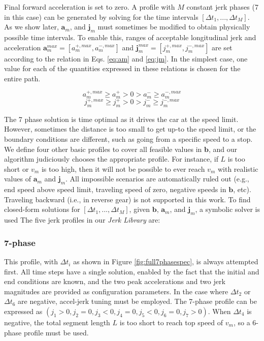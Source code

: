 \documentclass[letterpaper, 10 pt, conference]{ieeeconf}  %
\begin{document}
Final forward acceleration is set to zero.
A profile with $M$ constant jerk phases (7 in this case) can be generated by solving for the time intervals $[\Delta t_1, ..., \Delta t_M]$.
As we show later, $\mathbf{a}_m$, and $\mathbf{j}_m$ must sometimes be modified to obtain physically possible time intervals.
To enable this, ranges of acceptable longitudinal jerk and acceleration $\mathbf{a}^{max}_m = [a^{+,max}_m , a^{-,max}_m]$ and $\mathbf{j}^{max}_m = [j^{+,max}_m , j^{-,max}_m]$ are set according to the relation in Eqs. \ref{eq:am} and \ref{eq:jm}.
In the simplest case, one value for each of the quantities expressed in these relations is chosen for the entire path.

\begin{equation}
  a^{+,max}_m \geqslant a^+_m > 0 > a^-_m \geqslant a^{-,max}_m
  \label{eq:am}
\end{equation}
\begin{equation}
  j^{+,max}_m \geqslant j^+_m > 0 > j^-_m \geqslant j^{-,max}_m
  \label{eq:jm}
\end{equation}

The 7 phase solution is time optimal as it drives the car at the speed limit. However, sometimes the distance is too small to get up-to the speed limit, or the boundary conditions are different, such as going from a specific speed to a stop. We define four other basic profiles to cover all feasible values in $\mathbf{b}$, and our algorithm judiciously chooses the appropriate profile. %
For instance, if $L$ is too short or $v_m$ is too high, then it will not be possible to ever reach $v_m$ with realistic values of $\mathbf{a}_m$ and $\mathbf{j}_m$.
All impossible scenarios are automatically ruled out (e.g., end speed above speed limit, traveling speed of zero, negative speeds in $\mathbf{b}$, etc).
Traveling backward (i.e., in reverse gear) is not supported in this work.
To find closed-form solutions for $[\Delta t_1, ..., \Delta t_M]$, given $\mathbf{b}$, $\mathbf{a}_m$, and $\mathbf{j}_m$, a symbolic solver is used 
The five jerk profiles in our {\it Jerk Library} are:

\subsubsection{7-phase} \label{sec:7phase}

This profile, with $\Delta t_i$ as shown in Figure \ref{fig:full7phasespec}, is always attempted first.
All time steps have a single solution, enabled by the fact that the initial and end conditions are known, and the two peak accelerations and two jerk magnitudes are provided as configuration parameters.
In the case where $\Delta t_2$ or $\Delta t_6$ are negative, accel-jerk tuning must be employed.
The 7-phase profile can be expressed as $( j_1 > 0 , j_2 = 0 , j_3 < 0 , j_4 = 0 , j_5 < 0 , j_6 = 0 , j_7 > 0 )$.
When $\Delta t_4$ is negative, the total segment length $L$ is too short to reach top speed of $v_m$, so a 6-phase profile must be used.
\end{document}
